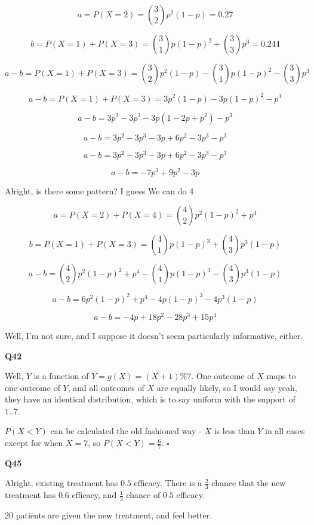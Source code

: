 \documentclass{article}
\newcommand{\qed}{\hfill$\square$}
\begin{document}
			$$a = P(X = 2) = {3 \choose 2}p^2(1-p) = 0.27$$
			
			$$b = P(X = 1) + P(X = 3) = {3 \choose 1}p(1-p)^2 + {3 \choose 3}p^3 = 0.244$$
			
			$$a - b = P(X = 1) + P(X = 3) = {3 \choose 2}p^2(1-p) - {3 \choose 1}p(1-p)^2 - {3 \choose 3}p^3$$
			
			$$a - b = P(X = 1) + P(X = 3) = 3p^2(1-p) - 3p(1-p)^2 - p^3$$
			
			$$a - b = 3p^2 - 3p^3 - 3p(1 - 2p + p^2) - p^3$$
			
			$$a - b = 3p^2 - 3p^3 - 3p + 6p^2 - 3p^3 - p^3$$
			
			$$a - b = 3p^2 - 3p^3 - 3p + 6p^2 - 3p^3 - p^3$$
			
			$$a - b = - 7p^3 + 9p^2  - 3p $$
			
			Alright, is there some pattern? I guess We can do 4
			
			$$a = P(X = 2) + P(X = 4) = {4 \choose 2}p^2(1-p)^2 + p^4$$
			
			$$b = P(X = 1) + P(X = 3) = {4 \choose 1}p(1-p)^3 + {4 \choose 3}p^3(1-p)$$
			
			$$a - b = {4 \choose 2}p^2(1-p)^2 + p^4 - {4 \choose 1}p(1-p)^3 - {4 \choose 3}p^3(1-p)$$
			
			$$a - b = 6p^2(1-p)^2 + p^4 - 4p(1-p)^3 - 4p^3(1-p)$$
			
			$$a - b = -4 p + 18 p^2 - 28 p^3 + 15 p^4$$
			
			Well, I'm not sure, and I suppose it doesn't seem particularly informative, either.
			
			\hfill
			
		\textbf{Q42}
		
			Well, $Y$ is a function of $Y = g(X) = (X+1)\%7$. One outcome of $X$ maps to one outcome of $Y$, and all outcomes of $X$ are equally likely, so I would say yeah, they have an identical distribution, which is to say uniform with the support of $1..7$.
			
			$P(X < Y)$ can be calculated the old fashioned way - $X$ is less than $Y$ in all cases except for when $X = 7$, so $P(X < Y) = \frac{6}{7}$. \qed
			
			\hfill
			
		\textbf{Q45}
		
			Alright, existing treatment has $0.5$ efficacy. There is a $\frac{2}{3}$ chance that the new treatment has $0.6$ efficacy, and $\frac{1}{3}$ chance of $0.5$ efficacy.
			
			20 patients are given the new treatment, and feel better.
			
\end{document}
